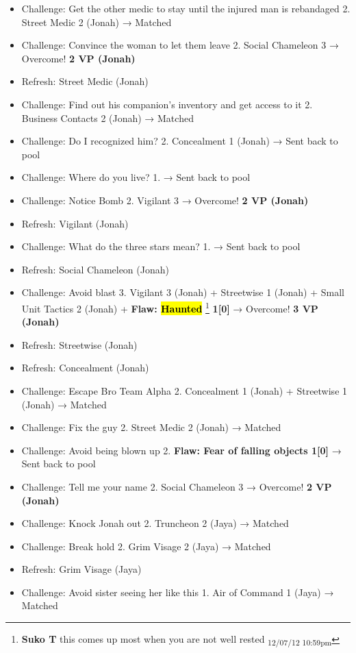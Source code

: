 \begin{itemize}
\item Challenge: Get the other medic to stay until the injured man is rebandaged 2.  Street Medic 2 (Jonah) → Matched
\item Challenge: Convince the woman to let them leave 2.  Social Chameleon 3 → Overcome! \textbf{2 VP (Jonah)}
\item Refresh: Street Medic (Jonah)
\item Challenge: Find out his companion's inventory and get access to it 2. Business Contacts 2 (Jonah) → Matched
\item Challenge: Do I recognized him? 2.  Concealment 1 (Jonah) → Sent back to pool
\item Challenge: Where do you live? 1. → Sent back to pool
\item Challenge: Notice Bomb 2. Vigilant 3 → Overcome! \textbf{2 VP (Jonah)}
\item Refresh: Vigilant (Jonah)
\item Challenge: What do the three stars mean? 1. → Sent back to pool
\item Refresh: Social Chameleon (Jonah)
\item Challenge: Avoid blast 3. Vigilant 3 (Jonah) + Streetwise 1 (Jonah) + Small Unit Tactics 2 (Jonah) + \textbf{ {\color[RGB]{255,0,0}Flaw: } }\textbf{ {\color[RGB]{255,0,0}\hl{Haunted}} }\footnote{\textbf{Suko T }this comes up most when you are not well rested \textsubscript{12/07/12 10:59pm}}\textbf{ {\color[RGB]{255,0,0} 1{[}0{]}} } → Overcome! \textbf{3 VP (Jonah)}
\item Refresh: Streetwise (Jonah)
\item Refresh: Concealment (Jonah)
\item Challenge: Escape Bro Team Alpha 2. Concealment 1 (Jonah) + Streetwise 1 (Jonah) → Matched
\item Challenge: Fix the guy 2.  Street Medic 2 (Jonah) → Matched
\item Challenge: Avoid being blown up 2. \textbf{ {\color[RGB]{255,0,0}Flaw: Fear of falling objects 1{[}0{]}} } → Sent back to pool
\item Challenge: Tell me your name 2. Social Chameleon 3 → Overcome! \textbf{2 VP (Jonah)}
\item Challenge: Knock Jonah out 2. Truncheon 2 (Jaya) → Matched
\item Challenge: Break hold 2. Grim Visage 2 (Jaya) → Matched
\item Refresh: Grim Visage (Jaya)
\item Challenge: Avoid sister seeing her like this 1. Air of Command 1 (Jaya) → Matched

\end{itemize}
